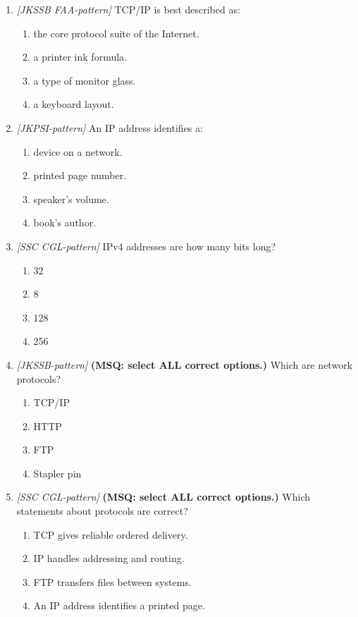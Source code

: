 \documentclass[11pt]{article}
\begin{document}
\begin{enumerate}[label=\textbf{Q\arabic*.}, leftmargin=*]
\item \textit{[JKSSB FAA-pattern]} TCP/IP is best described as:
  \begin{enumerate}[label=\Alph*.]
    \item the core protocol suite of the Internet.
    \item a printer ink formula.
    \item a type of monitor glass.
    \item a keyboard layout.
  \end{enumerate}
\item \textit{[JKPSI-pattern]} An IP address identifies a:
  \begin{enumerate}[label=\Alph*.]
    \item device on a network.
    \item printed page number.
    \item speaker's volume.
    \item book's author.
  \end{enumerate}
\item \textit{[SSC CGL-pattern]} IPv4 addresses are how many bits long?
  \begin{enumerate}[label=\Alph*.]
    \item 32
    \item 8
    \item 128
    \item 256
  \end{enumerate}
\item \textit{[JKSSB-pattern]} \textbf{(MSQ: select ALL correct options.)} Which are network protocols?
  \begin{enumerate}[label=\Alph*.]
    \item TCP/IP
    \item HTTP
    \item FTP
    \item Stapler pin
  \end{enumerate}
\item \textit{[SSC CGL-pattern]} \textbf{(MSQ: select ALL correct options.)} Which statements about protocols are correct?
  \begin{enumerate}[label=\Alph*.]
    \item TCP gives reliable ordered delivery.
    \item IP handles addressing and routing.
    \item FTP transfers files between systems.
    \item An IP address identifies a printed page.
  \end{enumerate}
\end{enumerate}
\def\JKSSBLessonID{41}\def\JKSSBAnswers{0}
\end{document}

